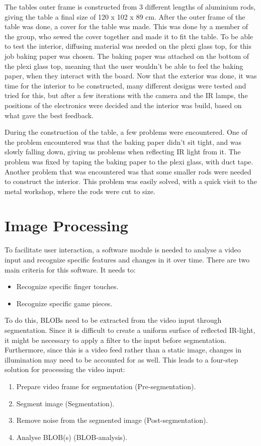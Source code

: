 The tables outer frame is constructed from 3 different lengths of aluminium rods, giving the table a final size of 120 x 102 x 89 cm.
After the outer frame of the table was done, a cover for the table was made. This was done by a member of the group, who sewed the cover together and made it to fit the table. To be able to test the interior, diffusing material was needed on the plexi glass top, for this job baking paper was chosen. The baking paper was attached on the bottom of the plexi glass top, meaning that the user wouldn't be able to feel the baking paper, when they interact with the board. 
Now that the exterior was done, it was time for the interior to be constructed, many different designs were tested and tried for this, but after a few iterations with the camera and the IR lamps, the positions of the electronics were decided and the interior was build, based on what gave the best feedback.

During the construction of the table, a few problems were encountered. One of the problem encountered was that the baking paper didn't sit tight, and was slowly falling down, giving us problems when reflecting IR light from it. The problem was fixed by taping the baking paper to the plexi glass, with duct tape. 
Another problem that was encountered was that some smaller rods were needed to construct the interior. This problem was easily solved, with a quick visit to the metal workshop, where the rods were cut to size. 

\section{Image Processing}
To facilitate user interaction, a software module is needed to analyse a video input and recognize specific features and changes in it over time. There are two main criteria for this software. It needs to:
\begin{itemize}
\item Recognize specific finger touches.
\item Recognize specific game pieces.
\end{itemize}

To do this, BLOBs need to be extracted from the video input through segmentation. Since it is difficult to create a uniform surface of reflected IR-light, it might be necessary to apply a filter to the input before segmentation. Furthermore, since this is a video feed rather than a static image, changes in illumination may need to be accounted for as well. This leads to a four-step solution for processing the video input:
\begin{enumerate}
\item Prepare video frame for segmentation (Pre-segmentation).
\item Segment image (Segmentation).
\item Remove noise from the segmented image (Post-segmentation).
\item Analyse BLOB(s) (BLOB-analysis).
\end{enumerate}

